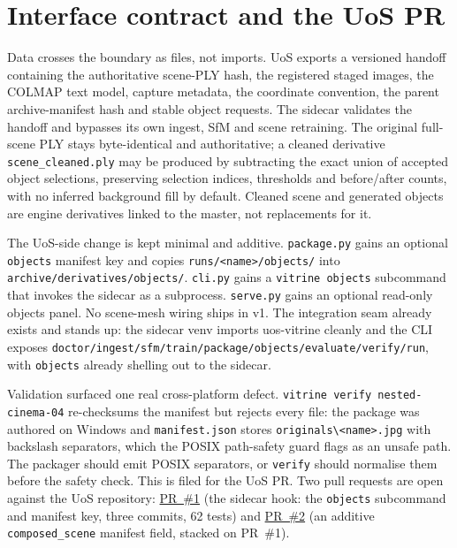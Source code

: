 \section{Interface contract and the UoS PR}

Data crosses the boundary as files, not imports. UoS exports a versioned handoff containing the
authoritative scene-PLY hash, the registered staged images, the COLMAP text model, capture metadata,
the coordinate convention, the parent archive-manifest hash and stable object requests. The sidecar
validates the handoff and bypasses its own ingest, SfM and scene retraining. The original full-scene
PLY stays byte-identical and authoritative; a cleaned derivative \texttt{scene\_cleaned.ply} may be
produced by subtracting the exact union of accepted object selections, preserving selection indices,
thresholds and before/after counts, with no inferred background fill by default. Cleaned scene and
generated objects are engine derivatives linked to the master, not replacements for it.

The UoS-side change is kept minimal and additive. \texttt{package.py} gains an optional
\texttt{objects} manifest key and copies \texttt{runs/<name>/objects/} into
\texttt{archive/derivatives/objects/}. \texttt{cli.py} gains a \texttt{vitrine objects} subcommand
that invokes the sidecar as a subprocess. \texttt{serve.py} gains an optional read-only objects
panel. No scene-mesh wiring ships in v1. The integration seam already exists and stands up: the
sidecar venv imports uos-vitrine cleanly and the CLI exposes
\texttt{doctor/\allowbreak ingest/\allowbreak sfm/\allowbreak train/\allowbreak package/\allowbreak objects/\allowbreak evaluate/\allowbreak verify/\allowbreak run}, with \texttt{objects} already
shelling out to the sidecar.

Validation surfaced one real cross-platform defect. \texttt{vitrine verify nested-cinema-04}
re-checksums the manifest but rejects every file: the package was authored on Windows and
\texttt{manifest.json} stores \texttt{originals\textbackslash <name>.jpg} with backslash separators,
which the POSIX path-safety guard flags as an unsafe path. The packager should emit POSIX
separators, or \texttt{verify} should normalise them before the safety check. This is filed for the
UoS PR. Two pull requests are open against the UoS repository:
\href{https://github.com/ArtechShadow/UOS-Vitrine/pull/1}{PR~\#1} (the sidecar hook: the
\texttt{objects} subcommand and manifest key, three commits, 62 tests) and
\href{https://github.com/ArtechShadow/UOS-Vitrine/pull/2}{PR~\#2} (an additive
\texttt{composed\_scene} manifest field, stacked on PR~\#1).
